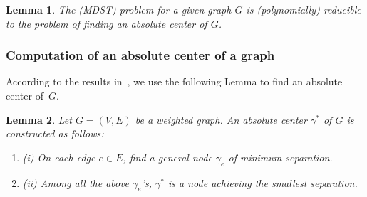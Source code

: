 \documentclass[10pt]{article}
\newcommand{\be}{\begin{enumerate}}
\newcommand{\ee}{\end{enumerate}}
\newtheorem{lemm}{Lemma}[section]
\begin{document}
\begin{lemm}\label{lem:abscenter} {\rm \cite{CaGM80}}
The (MDST) problem for a given graph $G$ is (polynomially) reducible to
the problem of finding an absolute center of $G$.
\end{lemm}

\subsubsection{Computation of an absolute center of a graph} \label{center}\hfill

\noindent
According to the results in~\cite{Chri75}, we use the following Lemma
to find an absolute center of~$G$.

\begin{lemm}\label{lem:hackimi}
Let $G=(V,E)$ be a weighted graph. An absolute center $\gamma^*$
of $G$ is constructed as follows:

\vspace{-0.9\baselineskip}
\be
\item[(i)] On each edge $e \in E$, find a general node $\gamma_e$
of minimum separation.
\item[(ii)] Among all the above $\gamma_e$'s, $\gamma^*$ is a node
achieving the smallest separation.
\ee
\end{lemm}
\end{document}
